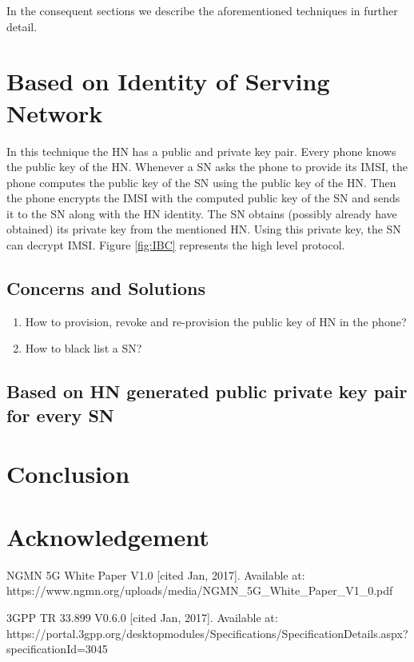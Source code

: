 \documentclass[lnicst,sechang,a4paper]{svmultln}
\begin{document}
In the consequent sections we describe the aforementioned techniques in further detail.

\section{Based on Identity of Serving Network} In this technique the HN has a public and private key pair. Every phone knows the public key of the HN. Whenever a SN asks the phone to provide its IMSI, the phone computes the public key of the SN using the public key of the HN. Then the phone encrypts the IMSI with the computed public key of the SN and sends it to the SN along with the HN identity. The SN obtains (possibly already have obtained) its private key from the mentioned HN. Using this private key, the SN can decrypt IMSI. Figure \ref{fig:IBC} represents the high level protocol.

\subsection{Concerns and Solutions}
\begin{enumerate}
\item How to provision, revoke and re-provision the public key of HN in the phone?
\item How to black list a SN?
\end{enumerate}

\subsection{Based on HN generated public private key pair for every SN}

\section{Conclusion}
\label{sec:conclusion}

\section{Acknowledgement}
\label{sec:acknowledgement}



\begin{thebibliography}{4}

 NGMN 5G White Paper V1.0 [cited Jan, 2017]. Available at: https://www.ngmn.org/uploads/media/NGMN\_5G\_White\_Paper\_V1\_0.pdf


 3GPP TR 33.899 V0.6.0 [cited Jan, 2017]. Available at: https://portal.3gpp.org/desktopmodules/Specifications/SpecificationDetails.aspx?specificationId=3045
\end{thebibliography}
\end{document}
